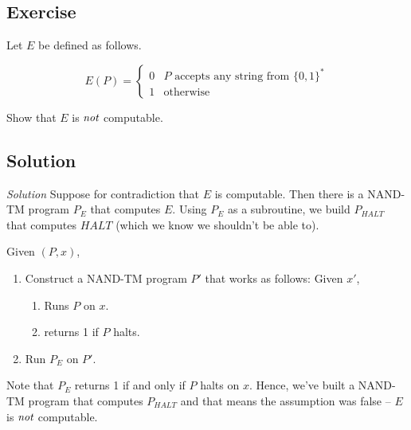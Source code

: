 \documentclass[11pt]{article}
\theoremstyle{definition}
\theoremstyle{remark}
\begin{document}
    
    \subsection{Exercise}
    Let $E$ be defined as follows.

   \begin{equation*}
       E(P) = \begin{cases}
           0 & \text{$P$ accepts any string from $\{0, 1\}^*$} \\
            1 & \text{otherwise}
        \end{cases}
    \end{equation*}

    Show that $E$ is $\emph{not}$ computable.
    
\subsection{Solution}
    
\emph{Solution} Suppose for contradiction that $E$ is computable. Then there is a NAND-TM program $P_E$ that computes $E$. Using
    $P_E$ as a subroutine, we build $P_{HALT}$ that computes $HALT$ (which we know we shouldn't be able to).

    Given $(P, x)$,
    \begin{enumerate}
        \item{
            Construct a NAND-TM program $P'$ that works as follows: Given $x'$,
            \begin{enumerate}
                \item{
                    Runs $P$ on $x$.
                }
            \item{
                    returns 1 if $P$ halts.
                }
            \end{enumerate}
            }
        \item{
            Run $P_E$ on $P'$. 
            }
    \end{enumerate}

    Note that $P_E$ returns 1 if and only if $P$ halts on $x$. Hence, we've built a NAND-TM program that computes $P_{HALT}$ and that means
    the assumption was false -- $E$ is $\emph{not}$ computable.
\end{document}
